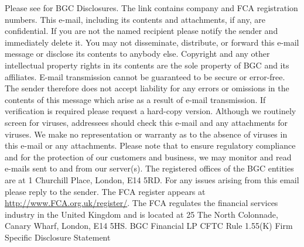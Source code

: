 \documentclass{report}
\begin{document}
Please see for BGC Disclosures. The link contains company and FCA
registration numbers. This e-mail, including its contents and
attachments, if any, are confidential. If you are not the named
recipient please notify the sender and immediately delete it. You may
not disseminate, distribute, or forward this e-mail message or
disclose its contents to anybody else. Copyright and any other
intellectual property rights in its contents are the sole property of
BGC and its affiliates. E-mail transmission cannot be guaranteed to be
secure or error-free.  The sender therefore does not accept liability
for any errors or omissions in the contents of this message which
arise as a result of e-mail transmission.  If verification is required
please request a hard-copy version. Although we routinely screen for
viruses, addressees should check this e-mail and any attachments for
viruses. We make no representation or warranty as to the absence of
viruses in this e-mail or any attachments. Please note that to ensure
regulatory compliance and for the protection of our customers and
business, we may monitor and read e-mails sent to and from our
server(s).  The registered offices of the BGC entities are at 1
Churchill Place, London, E14 5RD.  For any issues arising from this
email please reply to the sender.  The FCA register appears at
\url{http://www.FCA.org.uk/register/}.  The FCA regulates the financial
services industry in the United Kingdom and is located at 25 The North
Colonnade, Canary Wharf, London, E14 5HS.  BGC Financial LP CFTC Rule
1.55(K) Firm Specific Disclosure Statement
\end{document}
